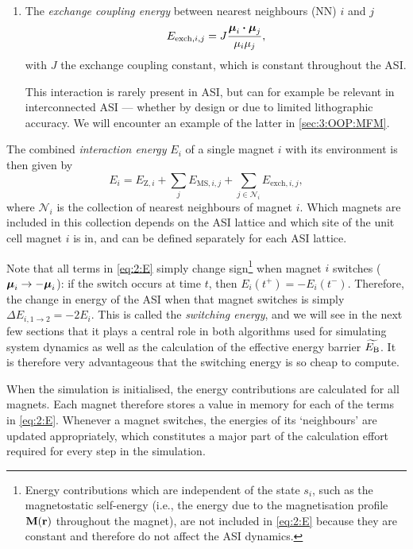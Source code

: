 \begin{enumerate}
	\item The \textit{exchange coupling energy} between nearest neighbours (NN) $i$ and $j$
	\begin{equation}
		\label{eq:2:E_exch}
		E_{\mathrm{exch},i,j} = J \frac{\boldsymbol{\mathbf{\mu}}_i \boldsymbol{\cdot} \boldsymbol{\mathbf{\mu}}_j}{\mu_i \mu_j} \mathrm{,}
	\end{equation}
	with $J$ the exchange coupling constant, which is constant throughout the ASI. \par
	This interaction is rarely present in ASI, but can for example be relevant in interconnected ASI --- whether by design or due to limited lithographic accuracy.
	We will encounter an example of the latter in \cref{sec:3:OOP:MFM}.
\end{enumerate}

The combined \textit{interaction energy} $E_i$ of a single magnet $i$ with its environment is then given by
\begin{equation}
	\label{eq:2:E}
	E_i = E_{\mathrm{Z},i} + \sum_j E_{\mathrm{MS},i,j} + \sum_{j \in \mathcal{N}_i} E_{\mathrm{exch},i,j} \mathrm{,}
\end{equation}
where $\mathcal{N}_i$ is the collection of nearest neighbours of magnet $i$.
Which magnets are included in this collection depends on the ASI lattice and which site of the unit cell magnet $i$ is in, and can be defined separately for each ASI lattice. \\\par
Note that all terms in \cref{eq:2:E} simply change sign\footnote{
	Energy contributions which are independent of the state $s_i$, such as the magnetostatic self-energy (i.e., the energy due to the magnetisation profile $\boldsymbol{\mathbf{M}}(\boldsymbol{\mathbf{r}})$ throughout the magnet), are not included in \cref{eq:2:E} because they are constant and therefore do not affect the ASI dynamics.
} when magnet $i$ switches ($\boldsymbol{\mathbf{\mu}}_i \rightarrow -\boldsymbol{\mathbf{\mu}}_i$): if the switch occurs at time $t$, then $E_i(t^+) = -E_i(t^-)$.
Therefore, the change in energy of the ASI when that magnet switches is simply $\Delta E_{i,1\rightarrow2} = -2 E_i$.
This is called the \textit{switching energy}, and we will see in the next few sections that it plays a central role in both algorithms used for simulating system dynamics as well as the calculation of the effective energy barrier $\widetilde{E_\mathrm{B}}$.
It is therefore very advantageous that the switching energy is so cheap to compute. \par
When the simulation is initialised, the energy contributions are calculated for all magnets.
Each magnet therefore stores a value in memory for each of the terms in \cref{eq:2:E}.
Whenever a magnet switches, the energies of its `neighbours' are updated appropriately, which constitutes a major part of the calculation effort required for every step in the simulation.

